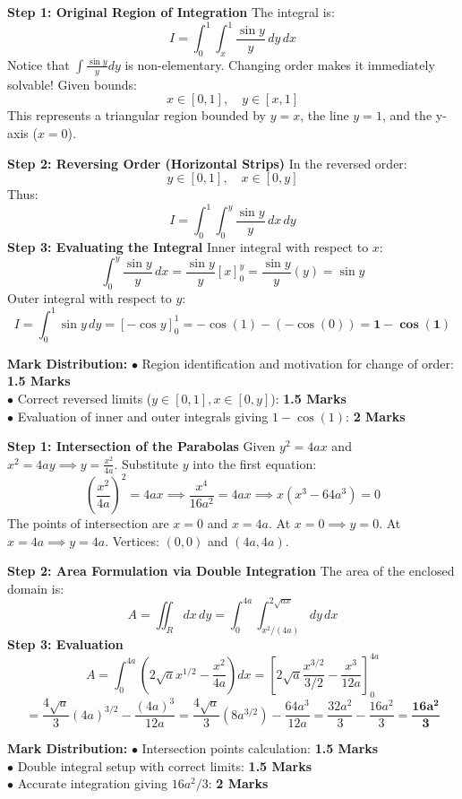 \begin{solutionbox}
\textbf{Step 1: Original Region of Integration}
The integral is:
\[
I = \int_0^1 \int_x^1 \frac{\sin y}{y} \, dy \, dx
\]
Notice that $\int \frac{\sin y}{y} dy$ is non-elementary. Changing order makes it immediately solvable!
Given bounds:
\[
x \in [0, 1], \quad y \in [x, 1]
\]
This represents a triangular region bounded by $y = x$, the line $y = 1$, and the y-axis ($x = 0$).

\textbf{Step 2: Reversing Order (Horizontal Strips)}
In the reversed order:
\[
y \in [0, 1], \quad x \in [0, y]
\]
Thus:
\[
I = \int_0^1 \int_0^y \frac{\sin y}{y} \, dx \, dy
\]
\textbf{Step 3: Evaluating the Integral}
Inner integral with respect to $x$:
\[
\int_0^y \frac{\sin y}{y} \, dx = \frac{\sin y}{y} [x]_0^y = \frac{\sin y}{y} (y) = \sin y
\]
Outer integral with respect to $y$:
\[
I = \int_0^1 \sin y \, dy = [-\cos y]_0^1 = -\cos(1) - (-\cos(0)) = \mathbf{1 - \cos(1)}
\]

\begin{markingrubric}
\textbf{Mark Distribution:}
$\bullet$ Region identification and motivation for change of order: \textbf{1.5 Marks}\\
$\bullet$ Correct reversed limits ($y \in [0,1], x \in [0,y]$): \textbf{1.5 Marks}\\
$\bullet$ Evaluation of inner and outer integrals giving $1 - \cos(1)$: \textbf{2 Marks}
\end{markingrubric}
\end{solutionbox}

\begin{solutionbox}
\textbf{Step 1: Intersection of the Parabolas}
Given $y^2 = 4ax$ and $x^2 = 4ay \implies y = \frac{x^2}{4a}$.
Substitute $y$ into the first equation:
\[
\left(\frac{x^2}{4a}\right)^2 = 4ax \implies \frac{x^4}{16a^2} = 4ax \implies x(x^3 - 64a^3) = 0
\]
The points of intersection are $x = 0$ and $x = 4a$.
At $x = 0 \implies y = 0$. At $x = 4a \implies y = 4a$.
Vertices: $(0,0)$ and $(4a, 4a)$.

\textbf{Step 2: Area Formulation via Double Integration}
The area of the enclosed domain is:
\[
A = \iint_R dx \, dy = \int_0^{4a} \int_{x^2/(4a)}^{2\sqrt{ax}} dy \, dx
\]
\textbf{Step 3: Evaluation}
\[
A = \int_0^{4a} \left( 2\sqrt{a} x^{1/2} - \frac{x^2}{4a} \right) dx = \left[ 2\sqrt{a} \frac{x^{3/2}}{3/2} - \frac{x^3}{12a} \right]_0^{4a}
\]
\[
= \frac{4\sqrt{a}}{3}(4a)^{3/2} - \frac{(4a)^3}{12a} = \frac{4\sqrt{a}}{3}(8 a^{3/2}) - \frac{64 a^3}{12a} = \frac{32a^2}{3} - \frac{16a^2}{3} = \mathbf{\frac{16a^2}{3}}
\]

\begin{markingrubric}
\textbf{Mark Distribution:}
$\bullet$ Intersection points calculation: \textbf{1.5 Marks}\\
$\bullet$ Double integral setup with correct limits: \textbf{1.5 Marks}\\
$\bullet$ Accurate integration giving $16a^2/3$: \textbf{2 Marks}
\end{markingrubric}
\end{solutionbox}

